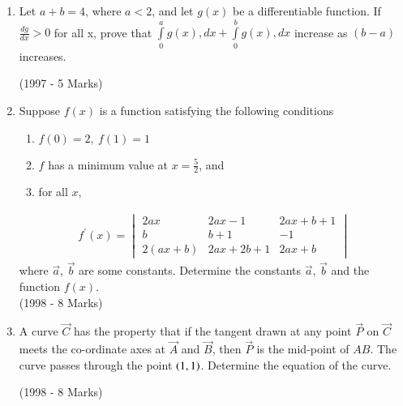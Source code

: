 \documentclass[journal]{IEEEtran}
\begin{document}
\begin{enumerate}
\item Let $a + b = 4$, where $a<2$, and let $g(x)$ be a differentiable function.
If $\frac{dg}{dx}>0$ for all x, prove that 
$\int\limits_0^a g(x), dx + \int\limits_0^b g(x), dx$ increase as $(b-a)$ increases.

\hfill (1997 - 5 Marks)


\item Suppose $f(x)$ is a function satisfying the following conditions
\begin{enumerate}
\item $f(0) = 2,\ f(1) = 1$
\item $f$ has a minimum value at $x = \frac{5}{2}$, and
\item for all $x$,
\end{enumerate}
\begin{align*}
f^{\prime}(x)=
\begin{vmatrix}
2ax & 2ax-1 & 2ax+b+1\\
b & b+1 & -1\\
2(ax+b) & 2ax+2b+1 & 2ax+b
\end{vmatrix}
\end{align*}
where $\vec{a}$, $\vec{b}$ are some constants. Determine the constants $\vec{a}$, $\vec{b}$ and the function $f(x)$.\\
\hfill (1998 - 8 Marks)

\item A curve $\vec{C}$ has the property that if the tangent drawn at any point $\vec{P}$ on $\vec{C}$ meets the co-ordinate axes at $\vec{A}$ and $\vec{B}$, then $\vec{P}$ is the mid-point of $AB$. The curve passes through the point $\left(1,1\right)$. Determine the equation of the curve.

\hfill (1998 - 8 Marks)

 
\end{enumerate}

 
\end{document}
